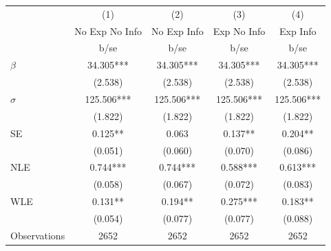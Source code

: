 {
\def\sym#1{\ifmmode^{#1}\else\(^{#1}\)\fi}
\begin{tabular}{l*{4}{c}}
\hline\hline
                    &\multicolumn{1}{c}{(1)}&\multicolumn{1}{c}{(2)}&\multicolumn{1}{c}{(3)}&\multicolumn{1}{c}{(4)}\\
                    &\multicolumn{1}{c}{No Exp No Info}&\multicolumn{1}{c}{No Exp Info}&\multicolumn{1}{c}{Exp No Info}&\multicolumn{1}{c}{Exp Info}\\
                    &        b/se   &        b/se   &        b/se   &        b/se   \\
\hline
$\beta$             &      34.305***&      34.305***&      34.305***&      34.305***\\
                    &     (2.538)   &     (2.538)   &     (2.538)   &     (2.538)   \\
$\sigma$            &     125.506***&     125.506***&     125.506***&     125.506***\\
                    &     (1.822)   &     (1.822)   &     (1.822)   &     (1.822)   \\
SE                  &       0.125** &       0.063   &       0.137** &       0.204** \\
                    &     (0.051)   &     (0.060)   &     (0.070)   &     (0.086)   \\
NLE                 &       0.744***&       0.744***&       0.588***&       0.613***\\
                    &     (0.058)   &     (0.067)   &     (0.072)   &     (0.083)   \\
WLE                 &       0.131** &       0.194** &       0.275***&       0.183** \\
                    &     (0.054)   &     (0.077)   &     (0.077)   &     (0.088)   \\
\hline
Observations        &        2652   &        2652   &        2652   &        2652   \\
\hline\hline
\end{tabular}
}
